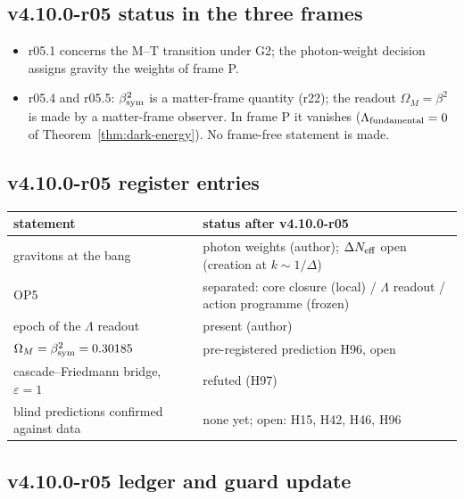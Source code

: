 \subsection*{v4.10.0-r05 status in the three frames}
\label{subsec:v4100-r05-frames}

\begin{itemize}[leftmargin=2em]
\item r05.1 concerns the M--T transition under G2; the photon-weight decision assigns gravity the weights of frame P.
\item r05.4 and r05.5: \(\beta_{\rm sym}^2\) is a matter-frame quantity (r22); the readout \(\Omega_M=\beta^2\) is made by a matter-frame observer.  In frame P it
vanishes (\(\Lambda_{\rm fundamental}=0\) of Theorem~\ref{thm:dark-energy}).  No frame-free statement is made.
\end{itemize}

\subsection*{v4.10.0-r05 register entries}
\label{subsec:v4100-r05-register}

\begin{center}
\small
\begin{tabular}{@{}>{\raggedright\arraybackslash}p{}>{\raggedright\arraybackslash}p{}@{}}
\toprule
statement & status after v4.10.0-r05\\
\midrule
gravitons at the bang & photon weights (author); \(\Delta N_{\rm eff}\) open (creation at \(k\sim1/\Delta\))\\
OP5 & separated: core closure (local) / \(\Lambda\) readout / action programme (frozen)\\
epoch of the \(\Lambda\) readout & present (author)\\
\(\Omega_M=\beta_{\rm sym}^2=0.30185\) & pre-registered prediction H96, open\\
cascade--Friedmann bridge, \(\varepsilon=1\) & refuted (H97)\\
blind predictions confirmed against data & none yet; open: H15, H42, H46, H96\\
\bottomrule
\end{tabular}
\end{center}

\subsection*{v4.10.0-r05 ledger and guard update}
\label{subsec:v4100-r05-ledger-guard}

